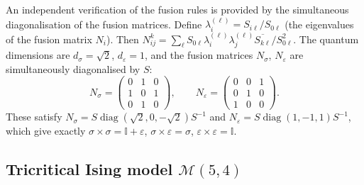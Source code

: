 \begin{remark}
\label{rem:verlinde-normalisation}
An independent verification of the fusion rules is provided by
the simultaneous diagonalisation of the fusion matrices. Define
$\lambda_i^{(\ell)} = S_{i\ell}/S_{0\ell}$ (the eigenvalues of the fusion
matrix $N_i$). Then $N_{ij}^k = \sum_\ell S_{0\ell} \lambda_i^{(\ell)}
\lambda_j^{(\ell)} \overline{S_{k\ell}}/S_{0\ell}^2$. The quantum
dimensions are $d_\sigma = \sqrt{2}$, $d_\varepsilon = 1$, and the fusion
matrices $N_\sigma$, $N_\varepsilon$ are simultaneously diagonalised by $S$:
\[
N_\sigma = \begin{pmatrix} 0 & 1 & 0 \\ 1 & 0 & 1 \\ 0 & 1 & 0 \end{pmatrix},
\qquad
N_\varepsilon = \begin{pmatrix} 0 & 0 & 1 \\ 0 & 1 & 0 \\ 1 & 0 & 0 \end{pmatrix}.
\]
These satisfy $N_\sigma = S \operatorname{diag}(\sqrt{2}, 0, -\sqrt{2}) S^{-1}$
and $N_\varepsilon = S \operatorname{diag}(1, -1, 1) S^{-1}$, which give
exactly $\sigma \times \sigma = \mathbb{I} + \varepsilon$,
$\sigma \times \varepsilon = \sigma$,
$\varepsilon \times \varepsilon = \mathbb{I}$.
\end{remark}


\subsection{\texorpdfstring{Tricritical Ising model $\mathcal{M}(5,4)$}{Tricritical Ising model M(5,4)}}
\label{subsec:tricritical-ising}

